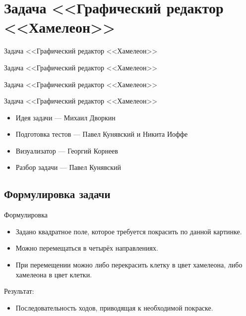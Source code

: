 \section{Задача <<Графический редактор <<Хамелеон>>}

\begin{frame}[t]{Задача <<Графический редактор <<Хамелеон>>}

  \begin{center}
    \LARGE Задача <<Графический редактор <<Хамелеон>>
  \end{center}

  \begin{center}
  \end{center}
\end{frame}

\begin{frame}[t]{Задача <<Графический редактор <<Хамелеон>>}

  \begin{center}
    \LARGE Задача <<Графический редактор <<Хамелеон>>
  \end{center}

  \begin{itemize}
    \item Идея задачи --- Михаил Дворкин
    \item Подготовка тестов --- Павел Кунявский и Никита Иоффе
    \item Визуализатор --- Георгий Корнеев
    \item Разбор задачи --- Павел Кунявский
  \end{itemize}
\end{frame}

\subsection{Формулировка задачи}

\begin{frame}[t]{Формулировка}
  \begin{itemize}
    \item Задано квадратное поле, которое требуется покрасить по данной картинке.
    \item Можно перемещаться в четырёх направлениях.
    \item При перемещении можно либо перекрасить клетку в цвет хамелеона, либо хамелеона в цвет клетки.
  \end{itemize}
  Результат:
  \begin{itemize}
    \item Последовательность ходов, приводящая к необходимой покраске.
  \end{itemize}
\end{frame}

